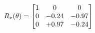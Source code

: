 \documentclass[preview]{standalone}
\begin{document}
\begin{align*}
\special{dvisvgm:raw <g id='unique000'>}R_{x}(\theta) = \begin{bmatrix}1 & 0 & 0 \\0 & -0.24 & -0.97 \\0 & +0.97 & -0.24\end{bmatrix}\special{dvisvgm:raw </g>}
\end{align*}
\end{document}
